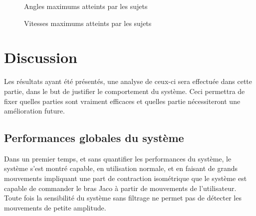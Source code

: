 \documentclass[letterpaper, twoside, 12pt, memoire, creativecommons, hyperref]{thETS}
\begin{document}
\begin{figure}
	\centering
	\caption{Angles maximums atteints par les sujets}
	\label{fig:effstats}
\end{figure}

\begin{figure}
	\centering
	\caption{Vitesses maximums atteints par les sujets}
	\label{fig:effstats}
\end{figure}

\chapter{Discussion}

Les résultats ayant été présentés, une analyse de ceux-ci sera effectuée dans cette partie, dans le but de justifier le comportement du système. Ceci permettra de fixer quelles parties sont vraiment efficaces et quelles partie nécessiteront une amélioration future.

\section{Performances globales du système}

Dans un premier temps, et sans quantifier les performances du système, le système s'est montré capable, en utilisation normale, et en faisant de grands mouvements impliquant une part de contraction isométrique que le système est capable de commander le bras Jaco à partir de mouvements de l'utilisateur. Toute fois la sensibilité du système sans filtrage ne permet pas de détecter les mouvements de petite amplitude. 
\end{document}
